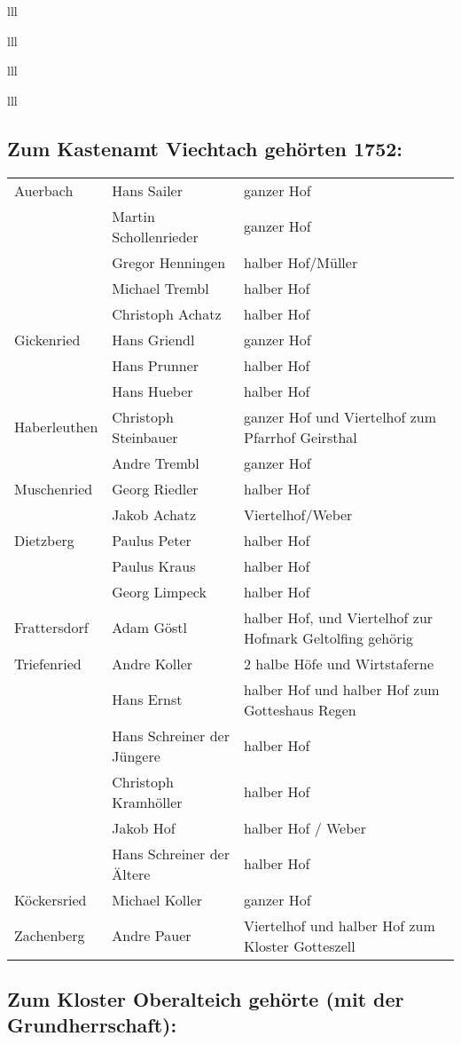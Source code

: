 \documentclass[12pt,a4pager]{book}
\begin{document}
\begin{tabuluar}{lll}
\begin{tabuluar}{lll}
\begin{tabuluar}{lll}
\begin{tabuluar}{lll}
\subsection{Zum Kastenamt Viechtach gehörten 1752:}

\begin{tabular}{lll}
Auerbach & Hans Sailer & ganzer Hof\\
& Martin Schollenrieder & ganzer Hof\\
& Gregor Henningen & halber Hof/Müller\\
& Michael Trembl & halber Hof\\
& Christoph Achatz & halber Hof\\
Gickenried & Hans Griendl & ganzer Hof\\
& Hans Prunner & halber Hof\\
& Hans Hueber & halber Hof\\
Haberleuthen & Christoph Steinbauer & ganzer Hof und Viertelhof zum Pfarrhof Geirsthal\\
& Andre Trembl & ganzer Hof\\
Muschenried & Georg Riedler & halber Hof\\
& Jakob Achatz & Viertelhof/Weber\\
Dietzberg & Paulus Peter & halber Hof\\
& Paulus Kraus & halber Hof\\
& Georg Limpeck & halber Hof\\
Frattersdorf & Adam Göstl & halber Hof, und Viertelhof zur Hofmark Geltolfing gehörig\\
Triefenried & Andre Koller & 2 halbe Höfe und Wirtstaferne\\
& Hans Ernst & halber Hof und halber Hof zum Gotteshaus Regen\\
& Hans Schreiner der Jüngere & halber Hof\\
& Christoph Kramhöller & halber Hof\\
& Jakob Hof & halber Hof / Weber\\
& Hans Schreiner der Ältere & halber Hof\\
Köckersried & Michael Koller & ganzer Hof\\
Zachenberg & Andre Pauer & Viertelhof und halber Hof zum Kloster Gotteszell\\
\end{tabular}

\subsection{Zum Kloster Oberalteich gehörte (mit der Grundherrschaft):}


\end{tabuluar}
\end{tabuluar}
\end{tabuluar}
\end{tabuluar}
\end{document}
